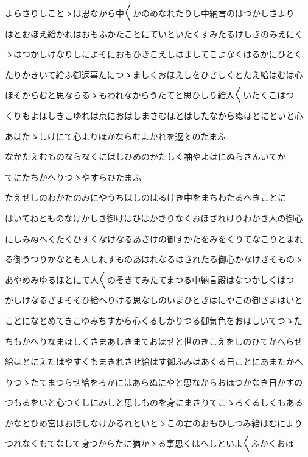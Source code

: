 \documentclass[a4paper,11pt,landscape]{ltjtarticle}
\begin{document}
\par\medskip
よらさりしことゝは思なから中〱かのめなれたりし中納言のはつかしさより
\par\medskip
はとおほえ給かれはおもふかたことにていといたくすみたるけしきのみえにく
\par\medskip
ゝはつかしけなりしによそにおもひきこえしはましてこよなくはるかにひとく
\par\medskip
たりかきいて給ふ御返事たにつゝましくおほえしをひさしくとたえ給はむは心
\par\medskip
ほそからむと思ならるゝもわれなからうたてと思ひしり給人〱いたくこはつ
\par\medskip
くりもよほしきこゆれは京におはしまさむほとはしたなからぬほとにといと心
\par\medskip
あはたゝしけにて心よりほかならむよかれを返〻のたまふ
\par\medskip
なかたえむものならなくにはしひめのかたしく袖やよはにぬらさんいてか
\par\medskip
てにたちかへりつゝやすらひたまふ
\par\medskip
たえせしのわかたのみにやうちはしのはるけき中をまちわたるへきことに
\par\medskip
はいてねとものなけかしき御けはひはかきりなくおほされけりわかき人の御心
\par\medskip
にしみぬへくたくひすくなけなるあさけの御すかたをみをくりてなこりとまれ
\par\medskip
る御うつりかなとも人しれすものあはれなるはされたる御心かなけさそものゝ
\par\medskip
あやめみゆるほとにて人〱のそきてみたてまつる中納言殿はなつかしくはつ
\par\medskip
かしけなるさまそそひ給へりける思なしのいまひときはにやこの御さまはいと
\par\medskip
ことになとめてきこゆみちすから心くるしかりつる御気色をおほしいてつゝた
\par\medskip
ちもかへりなまほしくさまあしきまておほせと世のきこえをしのひてかへらせ
\par\medskip
給ほとにえたはやすくもまきれさせ給はす御ふみはあくる日ことにあまたかへ
\par\medskip
りつゝたてまつらせ給をろかにはあらぬにやと思なからおほつかなき日かすの
\par\medskip
つもるをいと心つくしにみしと思しものを身にまさりてこゝろくるしくもある
\par\medskip
かなとひめ宮はおほしなけかるれといとゝこの君のおもひしつみ給はむにより
\par\medskip
つれなくもてなして身つからたに猶かゝる事思くはへしといよ〱ふかくおほ
\end{document}
